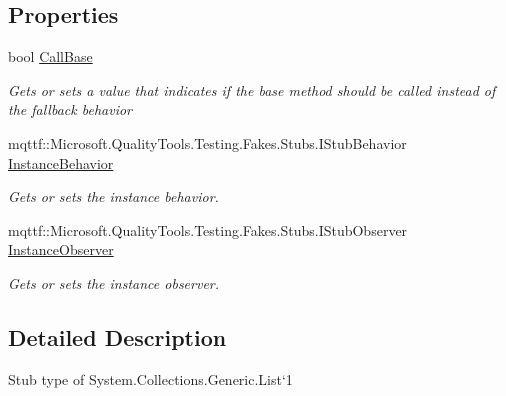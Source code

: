 \subsection*{Properties}
\begin{DoxyCompactItemize}
\item 
bool \hyperlink{class_system_1_1_collections_1_1_generic_1_1_fakes_1_1_stub_list_3_01_t_01_4_aadd74f0c8a7002983ed266407c08f600}{Call\-Base}
\begin{DoxyCompactList}\small\item\em Gets or sets a value that indicates if the base method should be called instead of the fallback behavior\end{DoxyCompactList}\item 
mqttf\-::\-Microsoft.\-Quality\-Tools.\-Testing.\-Fakes.\-Stubs.\-I\-Stub\-Behavior \hyperlink{class_system_1_1_collections_1_1_generic_1_1_fakes_1_1_stub_list_3_01_t_01_4_a4e21ab3f61795e9d5bf22079fd4341fd}{Instance\-Behavior}
\begin{DoxyCompactList}\small\item\em Gets or sets the instance behavior.\end{DoxyCompactList}\item 
mqttf\-::\-Microsoft.\-Quality\-Tools.\-Testing.\-Fakes.\-Stubs.\-I\-Stub\-Observer \hyperlink{class_system_1_1_collections_1_1_generic_1_1_fakes_1_1_stub_list_3_01_t_01_4_a89666d8079bd941265ad772ae07c9945}{Instance\-Observer}
\begin{DoxyCompactList}\small\item\em Gets or sets the instance observer.\end{DoxyCompactList}\end{DoxyCompactItemize}


\subsection{Detailed Description}
Stub type of System.\-Collections.\-Generic.\-List`1



